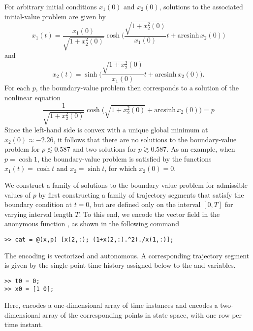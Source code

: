 For arbitrary initial conditions $x_1(0)$ and $x_2(0)$, solutions to the associated initial-value problem are given by
\begin{equation}
x_1(t)=\frac{x_1(0)}{\sqrt{1+x_2^2(0)}}\cosh\bigg(\frac{\sqrt{1+x_2^2(0)}}{x_1(0)}t+\mathrm{arcsinh}\, x_2(0)\bigg)
\end{equation}
and
\begin{equation}
x_2(t)=\sinh\bigg(\frac{\sqrt{1+x_2^2(0)}}{x_1(0)}t+\mathrm{arcsinh}\, x_2(0)\bigg).
\end{equation}
For each $p$, the boundary-value problem then corresponds to a solution of the nonlinear equation
\begin{equation}
\frac{1}{\sqrt{1+x_2^2(0)}}\cosh\bigg(\sqrt{1+x_2^2(0)}+\mathrm{arcsinh}\, x_2(0)\bigg)=p
\end{equation}
Since the left-hand side is convex with a unique global minimum at $x_2(0)\approx-2.26$, it follows that there are no solutions to the boundary-value problem for $p\lesssim 0.587$ and two solutions for $p\gtrsim 0.587$. As an example, when $p=\cosh 1$, the boundary-value problem is satisfied by the functions $x_1(t)=\cosh t$ and $x_2=\sinh t$, for which $x_2(0)=0$.

We construct a family of solutions to the boundary-value problem for admissible values of $p$ by first constructing a family of trajectory segments that satisfy the boundary condition at $t=0$, but are defined only on the interval $[0,T]$ for varying interval length $T$. To this end, we encode the vector field in the anonymous function , as shown in the following command
\begin{lstlisting}[language=coco-highlight]
>> cat = @(x,p) [x(2,:); (1+x(2,:).^2)./x(1,:)];
\end{lstlisting}
The encoding is vectorized and autonomous. A corresponding trajectory segment is given by the single-point time history assigned below to the  and  variables.
\begin{lstlisting}[language=coco-highlight]
>> t0 = 0;
>> x0 = [1 0];
\end{lstlisting}
Here,  encodes a one-dimensional array of time instances and  encodes a two-dimensional array of the corresponding points in state space, with one row per time instant.

